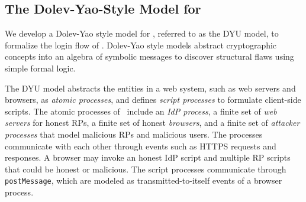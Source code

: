 

\subsection{The Dolev-Yao-Style Model for \usso}
\label{dy-model}

We develop a Dolev-Yao style model \cite{SPRESSO, FettKS16, FettKS17} for \usso, referred to as the DYU model, to formalize the login flow of \usso. Dolev-Yao style models abstract cryptographic concepts into an algebra of symbolic messages to discover structural flaws using simple formal logic. %

The DYU model abstracts the entities in a web system, such as web servers and browsers, as \emph{atomic processes}, %
and defines \emph{script processes} to formulate client-side scripts.
The atomic processes of \usso~include an {\em IdP process}, a finite set of {\em web servers} for honest RPs, a finite set of honest {\em browsers}, and a finite set of {\em attacker processes} that model malicious RPs and malicious users.
The processes communicate with each other through events such as HTTPS requests and responses. A browser may invoke an honest IdP script and multiple RP scripts that could be honest or malicious.
The script processes communicate through \verb+postMessage+, which are modeled as transmitted-to-itself events of a browser process.


